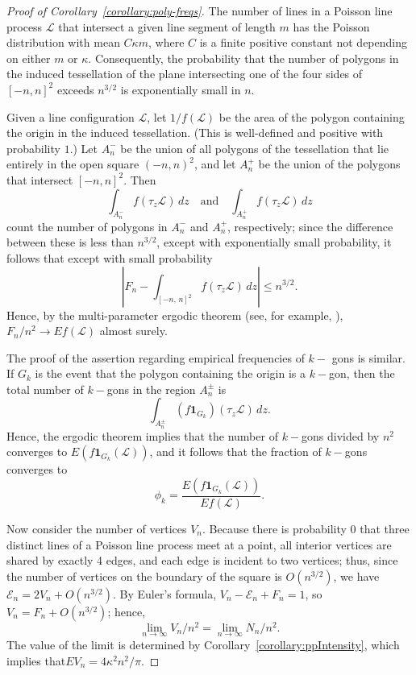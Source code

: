 \documentclass[10pt]{amsart}
\theoremstyle{definition}\newtheorem{defi}[theo]{Definition}\newtheorem{rema}[theo]{Remark}\newtheorem{exam}[theo]{Example}\newtheorem{exem}[theo]{Example}\newtheorem{nota}[theo]{Notation}
\begin{document}
\begin{proof}[Proof of Corollary~\ref{corollary:poly-freqs}]
The number of lines in a Poisson line process $\mathcal{L}$ that intersect a given line segment of length $m$ has the Poisson distribution with mean $C{\kappa}m$, where $C$ is a finite positive constant not depending on either $m$ or $\kappa$. Consequently, the probability that the number of polygons in the induced tessellation of the plane intersecting one of the four sides of $[-n,n]^{2}$ exceeds $n^{3/2}$ is exponentially small in $n$.

Given a line configuration $\mathcal{L}$, let $1/f (\mathcal{L})$ be the area of the polygon containing the origin in the induced tessellation. (This is well-defined and positive with probability $1$.) Let $A^{-}_{n}$ be the union of all polygons of the tessellation that lie entirely in the open square $(-n,n)^{2}$, and let $A^{+}_{n}$ be the union of the polygons that intersect $[-n,n]^{2}$. Then
\[
\int_{A^{-}_{n}} f (\tau_{z}\mathcal{L}) \,dz\quad \text{and} \quad \int_{A^{+}_{n}} f (\tau_{z}\mathcal{L}) \,dz
\]
count the number of polygons in $A^{-}_{n}$ and $A^{+}_{n}$, respectively; since the difference between these is less than $n^{3/2}$, except with exponentially small probability, it follows that except with small probability
\[
\left\lvert F_{n}- \int_{[-n,\,n]^{2}} f (\tau_{z}\mathcal{L})
\,dz\right\rvert \leq n^{3/2}.
\]
Hence, by the multi-parameter ergodic theorem (see, for example, \cite{Calderon}), $F_{n}/n^{2}\rightarrow Ef(\mathcal{L})$ almost surely.

The proof of the assertion regarding empirical frequencies of $k-$ gons is similar. If $G_{k}$ is the event that the polygon containing the origin is a $k-$gon, then the total number of $k-$gons in the region $A^{\pm}_{n}$ is
\[
\int_{A^{\pm}_{n}} (f\mathbf{1}_{G_{k}}) (\tau_{z}\mathcal{L})\,dz.
\]
Hence, the ergodic theorem implies that the number of $k-$gons divided by $n^{2}$ converges to $E (f\textbf{1}_{G_{k}} (\mathcal{L}))$, and it follows that the fraction of $k-$gons converges to
\[
\phi _{k}=\frac{E (f\textbf{1}_{G_{k}} (\mathcal{L}))}{Ef (\mathcal{L})}.
\]


Now consider the number of vertices $V_{n}$. Because there is probability $0$ that three distinct lines of a Poisson line process meet at a point, all interior vertices are shared by exactly 4 edges, and each edge is incident to two vertices; thus, since the number of vertices on the boundary of the square is $O (n^{3/2})$, we have $\mathcal{E}_{n}=2V_{n}+O (n^{3/2})$. By Euler's formula, $V_{n}-\mathcal{E}_{n}+F_{n}=1$, so $V_{n}=F_{n}+O (n^{3/2})$; hence,
\[
\lim_{n \rightarrow \infty }V_{n}/n^{2} = \lim_{n \rightarrow
\infty }N_{n}/n^{2}.
\]
The value of the limit is determined by Corollary~\ref{corollary:ppIntensity}, which implies that\linebreak$EV_{n}=4\kappa^{2}n^{2}/\pi.$
\end{proof}
\end{document}
